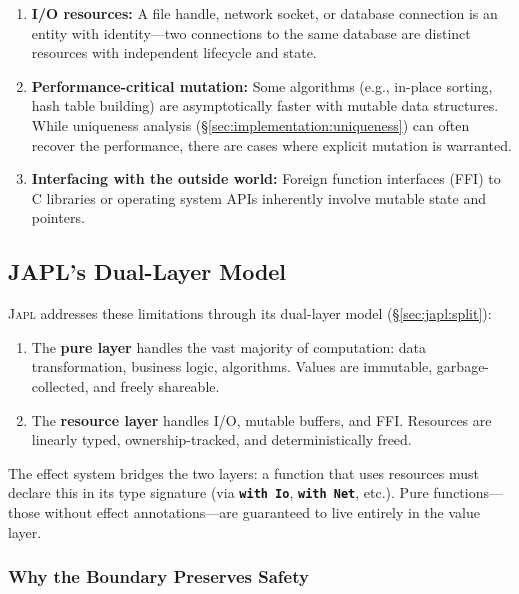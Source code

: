 \documentclass[11pt]{article}
\theoremstyle{definition}
\theoremstyle{remark}
\newcommand{\japl}{\textsc{Japl}}
\newcommand{\keyword}[1]{\texttt{\textbf{#1}}}
\begin{document}
\begin{enumerate}
  \item \textbf{I/O resources:} A file handle, network socket, or
    database connection is an entity with identity---two connections
    to the same database are distinct resources with independent
    lifecycle and state.

  \item \textbf{Performance-critical mutation:} Some algorithms
    (e.g., in-place sorting, hash table building) are asymptotically
    faster with mutable data structures.  While uniqueness analysis
    (\S\ref{sec:implementation:uniqueness}) can often recover the
    performance, there are cases where explicit mutation is warranted.

  \item \textbf{Interfacing with the outside world:} Foreign function
    interfaces (FFI) to C libraries or operating system APIs inherently
    involve mutable state and pointers.
\end{enumerate}

\subsection{JAPL's Dual-Layer Model}

\japl{} addresses these limitations through its dual-layer model
(\S\ref{sec:japl:split}):

\begin{enumerate}
  \item The \textbf{pure layer} handles the vast majority of
    computation: data transformation, business logic, algorithms.
    Values are immutable, garbage-collected, and freely shareable.

  \item The \textbf{resource layer} handles I/O, mutable buffers,
    and FFI.  Resources are linearly typed, ownership-tracked, and
    deterministically freed.
\end{enumerate}

The effect system bridges the two layers: a function that uses resources
must declare this in its type signature (via \keyword{with Io},
\keyword{with Net}, etc.).  Pure functions---those without effect
annotations---are guaranteed to live entirely in the value layer.

\subsubsection{Why the Boundary Preserves Safety}
\end{document}
